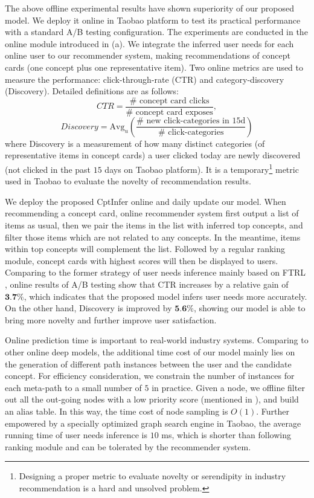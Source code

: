 The above offline experimental results have shown superiority of our proposed model.
We deploy it online in Taobao platform to test its practical performance with a standard A/B testing configuration.
The experiments are conducted in the online module introduced in  (a).
We integrate the inferred user needs for each online user to our recommender system, 
making recommendations of concept cards (one concept plus one representative item).
Two online metrics are used to measure the performance: 
click-through-rate (CTR) and category-discovery (Discovery). Detailed definitions are as follows:
\begin{equation}
CTR = \frac{\# \text{ concept card clicks}}{\# \text{ concept card exposes}},
\end{equation}
\begin{equation}
Discovery = \text{Avg}_u(\frac{\# \text{ new click-categories in 15d}} {\# \text{ click-categories}})
\end{equation}
where Discovery is a measurement of how many distinct categories (of representative items in concept cards) a user clicked today are newly discovered (not clicked in the past $15$ days on Taobao platform).
It is a temporary\footnote{Designing a proper metric to evaluate novelty or serendipity in industry recommendation is a hard and unsolved problem.} metric used in Taobao to evaluate the novelty of recommendation results.

We deploy the proposed CptInfer online and daily update our model.
When recommending a concept card, online recommender system first output a list of items as usual, 
then we pair the items in the list with inferred top concepts, and filter those items which are not related to any concepts. In the meantime, items within top concepts will complement the list.
Followed by a regular ranking module, concept cards with highest scores will then be displayed to users.
Comparing to the former strategy of user needs inference mainly based on FTRL \cite{mcmahan2013ad}, 
online results of A/B testing show that CTR increases by a relative gain of $\textbf{3.7\%}$, 
which indicates that the proposed model infers user needs more accurately. 
On the other hand, Discovery is improved by $\textbf{5.6\%}$, 
showing our model is able to bring more novelty and further improve user satisfaction.

Online prediction time is important to real-world industry systems. 
Comparing to other online deep models, 
the additional time cost of our model mainly lies on the generation of different path instances between the user and the candidate concept.
For efficiency consideration,
we constrain the number of instances for each meta-path to a small number of $5$ in practice. Given a node, we offline filter out all the out-going nodes with a low priority score (mentioned in ), and build an alias table.
In this way, the time cost of node sampling is $O(1)$.
Further empowered by a specially optimized graph search engine in Taobao, 
the average running time of user needs inference is $10$ ms, 
which is shorter than following ranking module and can be tolerated by the recommender system.

